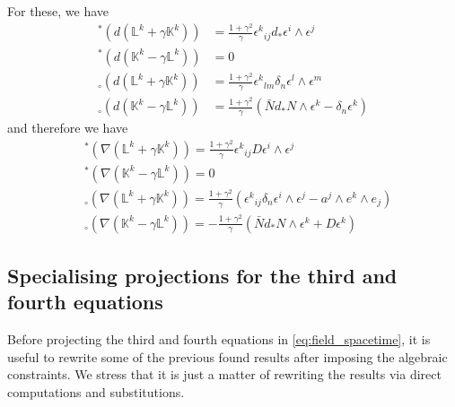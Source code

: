 \documentclass[a4paper, 11pt]{article}
\def\L{\mathbb{L}}
\def\K{\mathbb{K}}
\def\ga{\gamma}
\def\de{\delta}
\def\ep{\epsilon}
\def\na{\nabla}
\def\we{\wedge}
\def\tp#1{{}^\ast\!#1}
\def\np#1{{}_\circ#1}
\numberwithin{equation}{section}
\begin{document}
For these, we have
\begin{subequations}
    \renewcommand{\theequation}{\theparentequation\alph{equation}}
    \begin{align}
        \tp\left(d\left(\L^k + \ga \K^k\right)\right) &= \tfrac{1 + \ga^2}\ga \ep^k{}_{ij} d_\ast \ep^i \we \ep^j \label{eq:dLK_tangent}\\ 
        \tp\left(d\left(\K^k - \ga \L^k\right)\right) &= 0\label{eq:dKL_tangent}\\ 
        \np\left(d\left(\L^k + \ga \K^k\right)\right) &= \tfrac{ 1 + \ga^2}\ga \ep^k{}_{lm} \de_n \ep^l \we \ep^m \label{eq:dLK_normal}\\ 
        \np\left(d\left(\K^k - \ga \L^k\right)\right) &= \tfrac{1 + \ga^2}\ga \left(\bar N d_\ast N \we \ep^k - \de_n \ep^k\right)\label{eq:dKL_normal}
    \end{align}
\end{subequations}
and therefore we have 
\begin{subequations}
    \renewcommand{\theequation}{\theparentequation\alph{equation}}
    \begin{align}
        &\tp\left(\na \left(\L^k + \ga \K^k\right)\right) = \tfrac{1 + \ga^2}\ga\ep^k{}_{ij} D \ep^i \we \ep^j  \label{eq:naLK_tangent}\\
        &\tp\left(\na \left(\K^k - \ga \L^k\right)\right) = 0  \label{eq:naKL_tangent} \\
        &\np\left(\na \left(\L^k + \ga \K^k\right)\right) = \tfrac{1 + \ga^2}\ga \left( \ep^k{}_{ij} \de_n \ep^i \we \ep^j - a^j \we e^k \we e_j\right) \label{eq:naLK_normal} \\ 
        &\np\left(\na \left(\K^k - \ga \L^k\right)\right) = -\tfrac{1 + \ga^2}\ga \left(\bar N d_\ast N \we \ep^k + D\ep^k\right)\label{eq:naKL_normal}
    \end{align}
\end{subequations}


\subsection{Specialising projections for the third and fourth equations}

Before projecting the third and fourth equations in \eqref{eq:field_spacetime}, it is useful to rewrite some of the previous found results after imposing the algebraic constraints. We stress that it is just a matter of rewriting the results via direct computations and substitutions.
\end{document}
